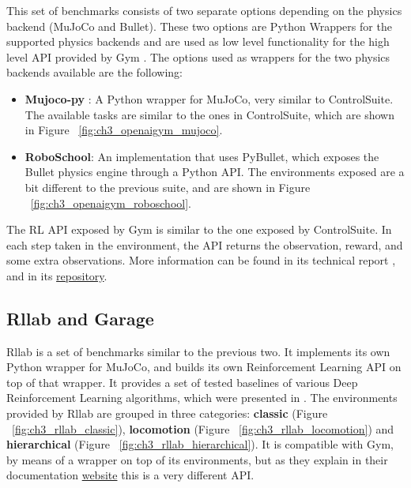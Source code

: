 This set of benchmarks consists of two separate options depending on the physics 
backend (MuJoCo and Bullet). These two options are Python Wrappers for the supported 
physics backends and are used as low level functionality for the high level API provided by Gym \citep{Gym}.
The options used as wrappers for the two physics backends available are the following:

\begin{itemize}
    \item \textbf{Mujoco-py} : A Python wrapper for MuJoCo, very similar to ControlSuite. 
          The available tasks are similar to the ones in ControlSuite, which are shown 
          in Figure ~\ref{fig:ch3_openaigym_mujoco}.

        \figBenchmarkOpenAIGymMujoco

    \item \textbf{RoboSchool}: An implementation that uses PyBullet, which exposes 
          the Bullet physics engine through a Python API. The environments exposed 
          are a bit different to the previous suite, and are shown in Figure ~\ref{fig:ch3_openaigym_roboschool}. 

        \figBenchmarkOpenAIGymRoboschool

\end{itemize}

The RL API exposed by Gym is similar to the one exposed by ControlSuite. 
In each step taken in the environment, the API returns the observation, 
reward, and some extra observations. More information can be found in its 
technical report \citep{Gym}, and in its \href{https://github.com/openai/gym}{repository}.

\subsection{Rllab and Garage} \label{subsec:ch3_rllab}

Rllab is a set of benchmarks similar to the previous two. It implements its own 
Python wrapper for MuJoCo, and builds its own Reinforcement Learning API on top 
of that wrapper. It provides a set of tested baselines of various Deep Reinforcement 
Learning algorithms, which were presented in \cite{Rllab}. The environments provided 
by Rllab are grouped in three categories: \textbf{classic} (Figure ~\ref{fig:ch3_rllab_classic}), 
\textbf{locomotion} (Figure ~\ref{fig:ch3_rllab_locomotion}) and \textbf{hierarchical} 
(Figure ~\ref{fig:ch3_rllab_hierarchical}). It is compatible with Gym, by means of 
a wrapper on top of its environments, but as they explain in their documentation 
\href{https://rllab.readthedocs.io/en/latest/user/gym_integration.html}{website} 
this is a very different API.

